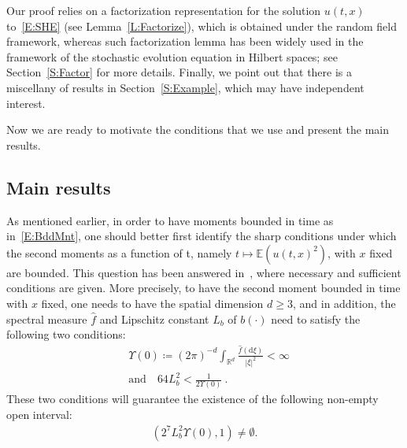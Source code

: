\documentclass[a4paper,11pt]{article}%
\theoremstyle{plain}
\theoremstyle{definition}
\numberwithin{equation}{section}
\newcommand{\R}{\mathbb{R}}
\newcommand{\E}{\mathbb{E}}
\newcommand{\ud}{\ensuremath{\mathrm{d}}}
\begin{document}

Our proof relies on a factorization representation for the solution $u(t,x)$ to~\eqref{E:SHE} (see
Lemma~\ref{L:Factorize}), which is obtained under the random field framework, whereas such
factorization lemma has been widely used in the framework of the stochastic evolution equation in
Hilbert spaces; see Section~\ref{S:Factor} for more details. Finally, we point out that there is a
miscellany of results in Section~\ref{S:Example}, which may have independent interest. \medskip

Now we are ready to motivate the conditions that we use and present the main results.

\subsection{Main results}\label{S:Main}

As mentioned earlier, in order to have moments bounded in time as in~\eqref{E:BddMnt}, one should
better first identify the sharp conditions under which the second moments as a function of t, namely $t \mapsto \E\left(u(t,x)^2\right)$,
with $x$ fixed are bounded. This question has been answered in~\cite[Theorem 1.3 and Lemma
2.5]{chen.kim:19:nonlinear}, where necessary and sufficient conditions are given. More precisely, to
have the second moment bounded in time with $x$ fixed, one needs to have the spatial dimension $d \ge
3$, and in addition, the spectral measure $\hat{f}$ and Lipschitz constant $L_b$ of $b(\cdot)$ need
to satisfy the following two conditions:
\begin{subequations}\label{E:U0finite}
\begin{align}\label{E:Dalang-00}
  & \Upsilon(0) \coloneqq \left(2\pi\right)^{-d} \int_{\R^d} \frac{\hat{f}(\ud \xi)}{|\xi|^2} <\infty \\
  & \text{and} \quad 64 L^2_{b} < \frac{1}{2\Upsilon(0)} \:. \label{E:Lipb}
\end{align}
\end{subequations}
These two conditions will guarantee the existence of the following non-empty open interval:
\begin{align}\label{E:Interval}
\left(2^7 L_b^2 \Upsilon(0), 1\right) \ne \emptyset.
\end{align}
\end{document}
